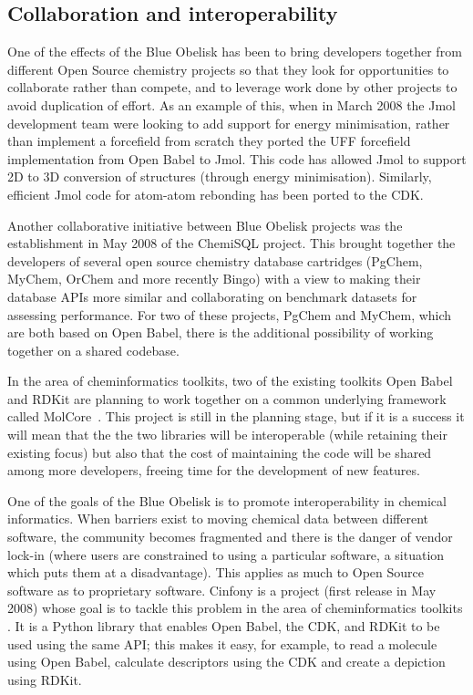 \documentclass[10pt]{bmc_article}
\newenvironment{bmcformat}{\fussy\setboolean{publ}{true}}{\fussy}
\begin{document}
\begin{bmcformat}
  \subsection*{Collaboration and interoperability}

One of the effects of the Blue Obelisk has been to bring developers
together from different Open Source chemistry projects so that they
look for opportunities to collaborate rather than compete, and to
leverage work done by other projects to avoid duplication of effort.
As an example of this, when in March 2008 the Jmol development team
were looking to add support for energy minimisation, rather than
implement a forcefield from scratch they ported the UFF forcefield\cite{Rappe:1992um}
implementation from Open Babel to Jmol. This code has allowed Jmol to
support 2D to 3D conversion of structures (through energy
minimisation). Similarly, efficient Jmol code for atom-atom rebonding
has been ported to the CDK.

Another collaborative initiative between Blue Obelisk projects was the establishment in May 2008 of
the ChemiSQL project. This brought together the developers of several
open source chemistry database cartridges (PgChem,\cite{WebPgChem} MyChem,\cite{WebMyChem} OrChem\cite{WebOrChem} and
more recently Bingo\cite{WebBingo}) with a view to making their database APIs more
similar and collaborating on benchmark datasets for assessing
performance. For two of these projects, PgChem and MyChem, which are both based on
Open Babel, there is the additional possibility of working together on a shared
codebase.

In the area of cheminformatics toolkits, two of the existing toolkits
Open Babel and RDKit are planning to work together on a common
underlying framework called MolCore~\cite{WebMolCore}. This project is still in the
planning stage, but if it is a success it will mean that the the two
libraries will be interoperable (while retaining their existing focus)
but also that the cost of maintaining the code will be shared among
more developers, freeing time for the development of new features.

One of the goals of the Blue Obelisk is to promote interoperability in chemical
informatics. When barriers exist to moving chemical data between
different software, the community becomes fragmented and there is
the danger of vendor lock-in (where users are constrained to using
a particular software, a situation which puts them at a
disadvantage). This applies as much to Open Source software as to
proprietary software. Cinfony is a project (first release in May 2008)
whose goal is to tackle this problem in the area of cheminformatics
toolkits \cite{OBoyleCinfony2008}.
It is a Python library that enables Open Babel, the CDK, and RDKit to
be used using the same API; this makes it easy, for example, to read a
molecule using Open Babel, calculate descriptors using the CDK and
create a depiction using RDKit.


\end{bmcformat}
\end{document}
